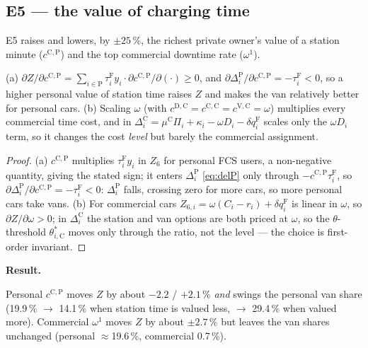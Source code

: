 \subsection{E5 --- the value of charging time}
\label{sec:e5}
E5 raises and lowers, by $\pm25$\,\%, the richest private owner's value of a station minute
($c^{\mathrm C,\mathrm P}$) and the top commercial downtime rate ($\omega^{1}$).

\begin{proposition}
\label{prop:e5}
(a) $\partial Z/\partial c^{\mathrm C,\mathrm P}=\sum_{i\in\mathrm P}\tau^{\mathrm F}_iy_i\cdot\partial c^{\mathrm C,\mathrm P}/\partial(\cdot)\ge0$,
and $\partial\Delta^{\mathrm P}_i/\partial c^{\mathrm C,\mathrm P}=-\tau^{\mathrm F}_i<0$, so a higher personal
value of station time raises $Z$ and makes the van relatively better for personal cars.
(b) Scaling $\omega$ (with $c^{\mathrm D,\mathrm C}=c^{\mathrm C,\mathrm C}=c^{\mathrm V,\mathrm C}=\omega$) multiplies
every commercial time cost, and in $\Delta^{\mathrm C}_i=\mu^{\mathrm C}\Pi_i+\kappa_i-\omega D_i-\delta q^{\mathrm F}_i$
scales only the $\omega D_i$ term, so it changes the cost \emph{level} but barely the commercial assignment.
\end{proposition}
\begin{proof}
(a) $c^{\mathrm C,\mathrm P}$ multiplies $\tau^{\mathrm F}_iy_i$ in $Z_6$ for personal FCS users, a non-negative
quantity, giving the stated sign; it enters $\Delta^{\mathrm P}_i$ \eqref{eq:delP} only through $-c^{\mathrm C,\mathrm P}\tau^{\mathrm F}_i$,
so $\partial\Delta^{\mathrm P}_i/\partial c^{\mathrm C,\mathrm P}=-\tau^{\mathrm F}_i<0$: $\Delta^{\mathrm P}_i$
falls, crossing zero for more cars, so more personal cars take vans. (b) For commercial cars $Z_{6,i}=\omega(C_i-r_i)+\delta q^{\mathrm F}_i$
is linear in $\omega$, so $\partial Z/\partial\omega>0$; in $\Delta^{\mathrm C}_i$ the station and van options are
both priced at $\omega$, so the $\theta$-threshold $\theta^{*}_{i,\mathrm C}$ moves only through the ratio, not the
level --- the choice is first-order invariant.
\end{proof}

\textbf{Result.}
\begin{table}[H]\centering
\caption{E5. Rows: MILP, RL zero-shot, RL retrained. $\Delta$ in \% against the baseline (paired instances).}

\end{table}
Personal $c^{\mathrm C,\mathrm P}$ moves $Z$ by about $-2.2$ / $+2.1$\,\% \emph{and} swings the personal van share
(19.9\,\% $\to$ 14.1\,\% when station time is valued less, $\to$ 29.4\,\% when valued more). Commercial $\omega^{1}$
moves $Z$ by about $\pm2.7$\,\% but leaves the van shares unchanged (personal $\approx$19.6\,\%, commercial 0.7\,\%).

